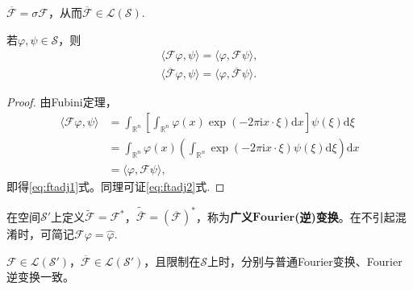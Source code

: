 \documentclass[../../main.tex]{subfiles}%
\begin{document}
\begin{proposition}
$\overline{\mathscr{F}}=\sigma\mathscr{F}$，从而$\overline{\mathscr{F}}\in\mathscr{L}(\mathscr{S})$.
\end{proposition}

\begin{proposition}
若$\varphi,\psi\in\mathscr{S}$，则
\begin{align}
\langle\mathscr{F}\varphi,\psi\rangle=\langle\varphi,\mathscr{F}\psi\rangle,\label{eq:ftadj1}\\
\langle\overline{\mathscr{F}}\varphi,\psi\rangle=\langle\varphi,\overline{\mathscr{F}}\psi\rangle.\label{eq:ftadj2}
\end{align}
\end{proposition}
\begin{proof}
由Fubini定理，
\begin{align*}
\langle\mathscr{F}\varphi,\psi\rangle&=\int_{\mathbb{R}^n}\left[\int_{\mathbb{R}^n}\varphi(x)\exp(-2\pi\mathrm{i}x\cdot\xi)\mathrm{d}x\right]\psi(\xi)\mathrm{d}\xi\\
&=\int_{\mathbb{R}^n}\varphi(x)\left(\int_{\mathbb{R}^n}\exp(-2\pi\mathrm{i}x\cdot\xi)\psi(\xi)\mathrm{d}\xi\right)\mathrm{d}x\\
&=\langle\varphi,\mathscr{F}\psi\rangle,
\end{align*}
即得\eqref{eq:ftadj1}式。同理可证\eqref{eq:ftadj2}式.
\end{proof}

\begin{definition}
在空间$\mathscr{S}'$上定义$\widetilde{\mathscr{F}}=\mathscr{F}^*$，$\widetilde{\overline{\mathscr{F}}}=(\overline{\mathscr{F}})^*$，称为\textbf{广义}$\mathbf{Fourier}$\textbf{(逆)变换}。在不引起混淆时，可简记$\mathscr{F}\varphi=\widehat{\varphi}$.
\end{definition}

\begin{proposition}
$\mathscr{F}\in\mathscr{L}(\mathscr{S}')$，$\overline{\mathscr{F}}\in\mathscr{L}(\mathscr{S}')$，且限制在$\mathscr{S}$上时，分别与普通Fourier变换、Fourier逆变换一致。
\end{proposition}
\end{document}
